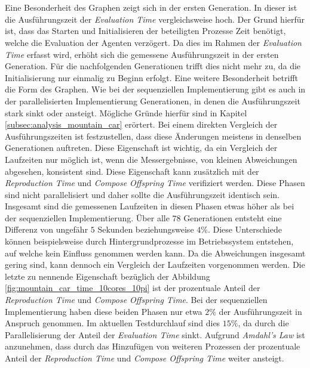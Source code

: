 \\\\
Eine Besonderheit des Graphen zeigt sich in der ersten Generation. In dieser ist die Ausführungszeit der \emph{Evaluation Time} vergleichsweise hoch. Der Grund hierfür ist, dass das Starten und Initialisieren der beteiligten Prozesse Zeit benötigt, welche die Evaluation der Agenten verzögert. Da dies im Rahmen der \emph{Evaluation Time} erfasst wird, erhöht sich die gemessene Ausführungszeit in der ersten Generation. Für die nachfolgenden Generationen trifft dies nicht mehr zu, da die Initialisierung nur einmalig zu Beginn erfolgt. Eine weitere Besonderheit betrifft die Form des Graphen. Wie bei der sequenziellen Implementierung gibt es auch in der parallelisierten Implementierung Generationen, in denen die Ausführungszeit stark sinkt oder ansteigt. Mögliche Gründe hierfür sind in Kapitel \ref{subsec:analysis_mountain_car} erörtert. Bei einem direkten Vergleich der Ausführungszeiten ist festzustellen, dass diese Änderungen meistens in denselben Generationen auftreten. Diese Eigenschaft ist wichtig, da ein Vergleich der Laufzeiten nur möglich ist, wenn die Messergebnisse, von kleinen Abweichungen abgesehen, konsistent sind. Diese Eigenschaft kann zusätzlich mit der \emph{Reproduction Time} und \emph{Compose Offspring Time} verifiziert werden. Diese Phasen sind nicht parallelisiert und daher sollte die Ausführungszeit identisch sein. Insgesamt sind die gemessenen Laufzeiten in diesen Phasen etwas höher als bei der sequenziellen Implementierung. Über alle $78$ Generationen entsteht eine Differenz von ungefähr $5$ Sekunden beziehungsweise $4\%$. Diese Unterschiede können beispielsweise durch Hintergrundprozesse im Betriebssystem entstehen, auf welche kein Einfluss genommen werden kann. Da die Abweichungen insgesamt gering sind, kann dennoch ein Vergleich der Laufzeiten vorgenommen werden. Die letzte zu nennende Eigenschaft bezüglich der Abbildung \ref{fig:mountain_car_time_10cores_10pi} ist der prozentuale Anteil der \emph{Reproduction Time} und \emph{Compose Offspring Time}. Bei der sequenziellen Implementierung haben diese beiden Phasen nur etwa $2\%$ der Ausführungszeit in Anspruch genommen. Im aktuellen Testdurchlauf sind dies $15\%$, da durch die Parallelisierung der Anteil der \emph{Evaluation Time} sinkt. Aufgrund \emph{Amdahl's Law} ist anzunehmen, dass durch das Hinzufügen von weiteren Prozessen der prozentuale Anteil der \emph{Reproduction Time} und \emph{Compose Offspring Time} weiter ansteigt.
